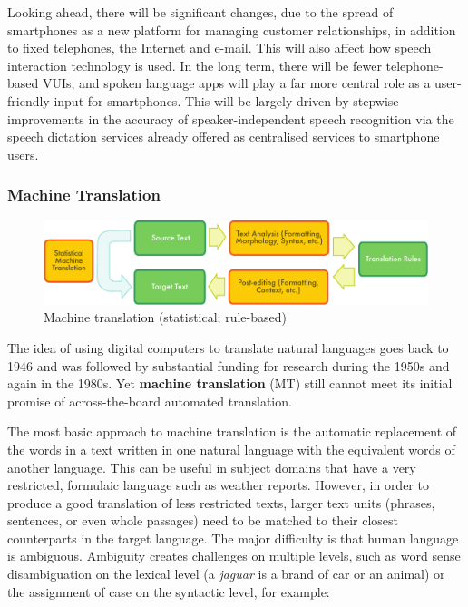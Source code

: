 \documentclass[]{../../metanetpaper}
\begin{document}
\begin{multicols}{2}
Looking ahead, there will be significant changes, due to the spread of smartphones as a new platform for managing customer relationships, in addition to fixed telephones, the Internet and e-mail. This will also affect how speech interaction technology is used. In the long term, there will be fewer telephone-based VUIs, and spoken language apps will play a far more central role as a user-friendly input for smartphones. This will be largely driven by stepwise improvements in the accuracy of speaker-independent speech recognition via the speech dictation services already offered as centralised services to smartphone users.

\subsubsection{Machine Translation}

\begin{figure}[htb]
  \center
  \includegraphics[width=\textwidth]{../_media/english/machine_translation}
  \caption{Machine translation (statistical; rule-based)}
  \label{fig:mtarch_en}
\end{figure}

The idea of using digital computers to translate natural languages goes back to 1946 and was followed by substantial funding for research during the 1950s and again in the 1980s. Yet \textbf{machine translation} (MT) still cannot meet its initial promise of across-the-board automated translation. 


The most basic approach to machine translation is the automatic replacement of the words in a text written in one natural language with the equivalent words of another language. This can be useful in subject domains that have a very restricted, formulaic language such as weather reports.
However, in order to produce a good translation of less restricted texts, larger text units (phrases, sentences, or even whole passages) need to be matched to their closest counterparts in the target language. The major difficulty is that human language is ambiguous. Ambiguity creates challenges on multiple levels, such as word sense disambiguation on the lexical level (a \textit{jaguar} is a brand of car or an animal) or the assignment of case on the syntactic level, for example:


\end{multicols}
\end{document}
